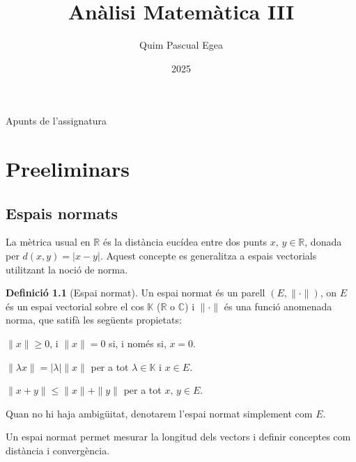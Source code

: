 \documentclass[12pt]{book}
\author{Quim Pascual Egea}
\title{Anàlisi Matemàtica III}
\date{2025}
\theoremstyle{definition}
\newtheorem{defi}[teorema]{Definició}
\theoremstyle{nota}
\theoremstyle{exemple}
\begin{document}
\makeatletter
\begin{titlepage}
  \noindent\Huge
  \begin{center}
    \textbf{\@title}
  \end{center}
  \vfill

  \noindent\large\sffamily
  Apunts de l'assignatura
  \hfill
  \@author
\end{titlepage}
\makeatother


\tableofcontents

\chapter{Preeliminars}

\section{Espais normats}

La mètrica usual en $\mathbb{R}$ és la distància eucídea entre dos
punts $x,\, y \in \mathbb{R}$, donada per $d(x,y) = |x-y|$. Aquest
concepte es generalitza a espais vectorials utilitzant la noció de
norma.

\begin{defi}[Espai normat]
  Un espai normat és un parell $(E, \|\cdot\|)$, on $E$ és un espai
  vectorial sobre el cos $\mathbb{K}$ ($\mathbb{R}$ o $\mathbb{C}$) i
  $\|\cdot\|$ és una funció anomenada norma, que satifà les següents
  propietats:
  \begin{description}[noitemsep]
  \item[Positivitat] $\|x\| \geq 0$, i $\|x\| = 0$ si, i només si,
    $x = 0$.
  \item[Homogeneïtat] $\|\lambda x\| = |\lambda| \|x\|$ per a tot
    $\lambda \in \mathbb{K}$ i $x \in E$.
  \item[Desigualtat triangular] $\|x + y\| \leq \|x\| + \|y\|$ per a
    tot $x,\, y \in E$.
  \end{description}
  Quan no hi haja ambigüitat, denotarem l'espai normat simplement com
  $E$.
\end{defi}

Un espai normat permet mesurar la longitud dels vectors i definir
conceptes com distància i convergència.
\end{document}
